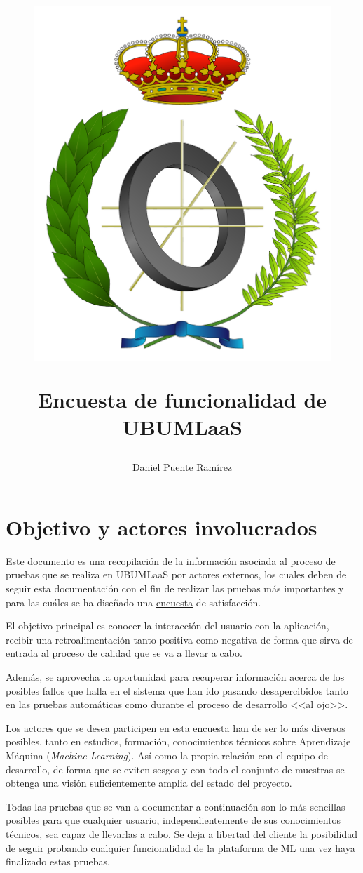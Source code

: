 \documentclass[
	12pt,
	spanish
]{article}
\title{
\begin{figure}[h!]
\centering
\includegraphics[width=0.5\linewidth]{../img/escudoInfor.pdf}
\end{figure}
Encuesta de funcionalidad de UBUMLaaS} %
\author{Daniel Puente Ramírez} %
\begin{document}
\maketitle 
\thispagestyle{empty}
\clearpage
\tableofcontents
\thispagestyle{empty}
\clearpage
\setcounter{page}{1}
\section{Objetivo y actores involucrados}
Este documento es una recopilación de la información asociada al proceso de pruebas que se realiza en UBUMLaaS por actores externos, los cuales deben de seguir esta documentación con el fin de realizar las pruebas más importantes y para las cuáles se ha diseñado una \href{https://forms.gle/yUoBxDyR3BaF7TjDA}{encuesta} de satisfacción.

El objetivo principal es conocer la interacción del usuario con la aplicación, recibir una retroalimentación tanto positiva como negativa de forma que sirva de entrada al proceso de calidad que se va a llevar a cabo. 

Además, se aprovecha la oportunidad para recuperar información acerca de los posibles fallos que halla en el sistema que han ido pasando desapercibidos tanto en las pruebas automáticas como durante el proceso de desarrollo <<al ojo>>. 

Los actores que se desea participen en esta encuesta han de ser lo más diversos posibles, tanto en estudios, formación, conocimientos técnicos sobre Aprendizaje Máquina (\textit{Machine Learning}). Así como la propia relación con el equipo de desarrollo, de forma que se eviten sesgos y con todo el conjunto de muestras se obtenga una visión suficientemente amplia del estado del proyecto.

Todas las pruebas que se van a documentar a continuación son lo más sencillas posibles para que cualquier usuario, independientemente de sus conocimientos técnicos, sea capaz de llevarlas a cabo. Se deja a libertad del cliente la posibilidad de seguir probando cualquier funcionalidad de la plataforma de ML una vez haya finalizado estas pruebas.

\clearpage
\end{document}
